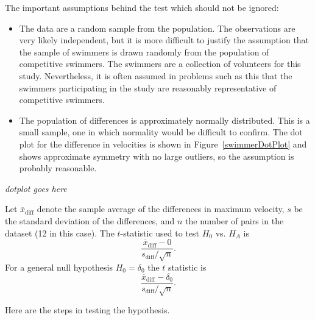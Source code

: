 The important assumptions behind the test which should not be ignored:
\begin{itemize}
	
	\item  The data are a random sample from the population.  The observations are very likely independent, but it is more difficult to justify the assumption that the sample of swimmers is drawn randomly from the population of competitive swimmers.  The swimmers are a collection of volunteers for this study.  Nevertheless, it is often assumed in problems such as this that the swimmers participating in the study are reasonably representative of competitive swimmers.
	
	\item The population of differences is approximately normally distributed.  This is a small sample, one in which normality would be difficult to confirm.  The dot plot for the difference in velocities is shown in Figure~\ref{swimmerDotPlot} and shows approximate symmetry with no large outliers, so the assumption is probably reasonable.
	
\end{itemize}	



\textit{dotplot goes here}

Let $\overline{x}_{\text{diff}}$ denote the sample average of the differences in maximum velocity, $s$ be the standard deviation of the differences, and $n$ the number of pairs in the dataset (12 in this case). The $t$-statistic used to test $H_0$ vs. $H_A$ is 
\[
        \frac{\overline{x}_{\text{diff}} - 0} {s_{\text{diff}}/\sqrt{n}}.
\]
For a general null hypothesis $H_0 = \delta_0$ the $t$ statistic is
\[
        \frac{\overline{x}_{\text{diff}} - \delta_0} {s_{\text{diff}}/\sqrt{n}}.
\]

Here are the steps in testing the hypothesis.

